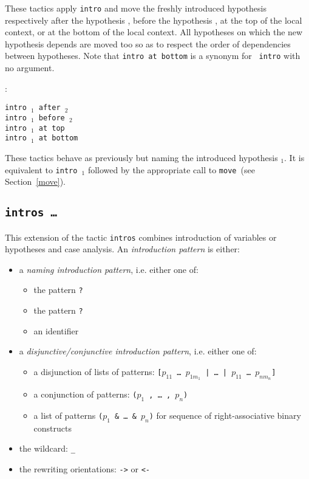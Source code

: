 \begin{coq_example*}
\begin{Variants}
  These tactics apply {\tt intro} and move the freshly introduced hypothesis
  respectively after the hypothesis \ident{}, before the hypothesis
  \ident{}, at the top of the local context, or at the bottom of the
  local context. All hypotheses on which the new hypothesis depends
  are moved too so as to respect the order of dependencies between
  hypotheses. Note that {\tt intro at bottom} is a synonym for {\tt
  intro} with no argument.

  \ErrMsg {} : {\ident}

\item {\tt intro \ident$_1$ after \ident$_2$}\\
      {\tt intro \ident$_1$ before \ident$_2$}\\
      {\tt intro \ident$_1$ at top}\\
      {\tt intro \ident$_1$ at bottom}

  These tactics behave as previously but naming the introduced hypothesis
  \ident$_1$.  It is equivalent to {\tt intro \ident$_1$} followed by
  the appropriate call to {\tt move}~(see Section~\ref{move}).

\end{Variants}

\subsection{\tt intros {\intropattern} {\ldots} {\intropattern}}
\label{intros-pattern}

This extension of the tactic {\tt intros} combines introduction of
variables or hypotheses and case analysis. An {\em introduction pattern} is
either:
\begin{itemize}
\item a {\em naming introduction pattern}, i.e. either one of:
  \begin{itemize}
  \item the pattern \texttt{?}
  \item the pattern \texttt{?\ident}
  \item an identifier
  \end{itemize}
\item a {\em disjunctive/conjunctive introduction pattern}, i.e. either one of:
  \begin{itemize}
  \item a disjunction of lists of patterns:
  {\tt [$p_{11}$ \dots\ $p_{1m_1}$ | \dots\ | $p_{11}$ \dots\ $p_{nm_n}$]}
  \item a conjunction of patterns: {\tt ($p_1$ , \dots\ , $p_n$)}
  \item a list of patterns {\tt ($p_1$ \&\ \dots\ \&\ $p_n$)}
   for sequence of right-associative binary constructs
  \end{itemize}
\item the wildcard: {\tt \_}
\item the rewriting orientations: {\tt ->} or {\tt <-}
\end{itemize}


\end{coq_example*}
